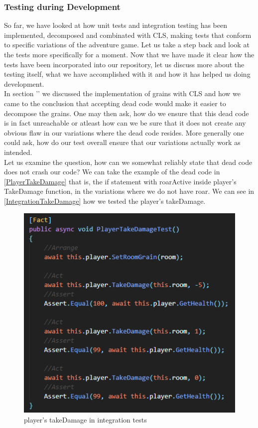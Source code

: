 \subsubsection{Testing during Development}
So far, we have looked at how unit tests and integration testing has been implemented, decomposed and combinated with CLS, making tests that conform to specific variations of the adventure game. Let us take a step back and look at the tests more specifically for a moment. Now that we have made it clear how the tests have been incorporated into our repository, let us discuss more about the testing itself, what we have accomplished with it and how it has helped us doing development. \\
In section '' we discussed the implementation of grains with CLS and how we came to the conclusion that accepting dead code would make it easier to decompose the grains. One may then ask, how do we ensure that this dead code is in fact unreachable or atleast how can we be sure that it does not create any obvious flaw in our variations where the dead code resides. More generally one could ask, how do our test overall ensure that our variations actually work as intended. \\ 
Let us examine the question, how can we somewhat reliably state that dead code does not crash our code? We can take the example of the dead code in \autoref{PlayerTakeDamage} that is, the if statement with roarActive inside player's TakeDamage function, in the variations where we do not have roar. We can see in \autoref{IntegrationTakeDamage} how we tested the player's takeDamage.
\begin{figure}[]
    \centering
    \includegraphics[width=0.6\linewidth]{Materials/TestingDiscussion/IntegrationTakeDamage}
    \caption{player's takeDamage in integration tests}
    \label{IntegrationTakeDamage}
\end{figure} 
